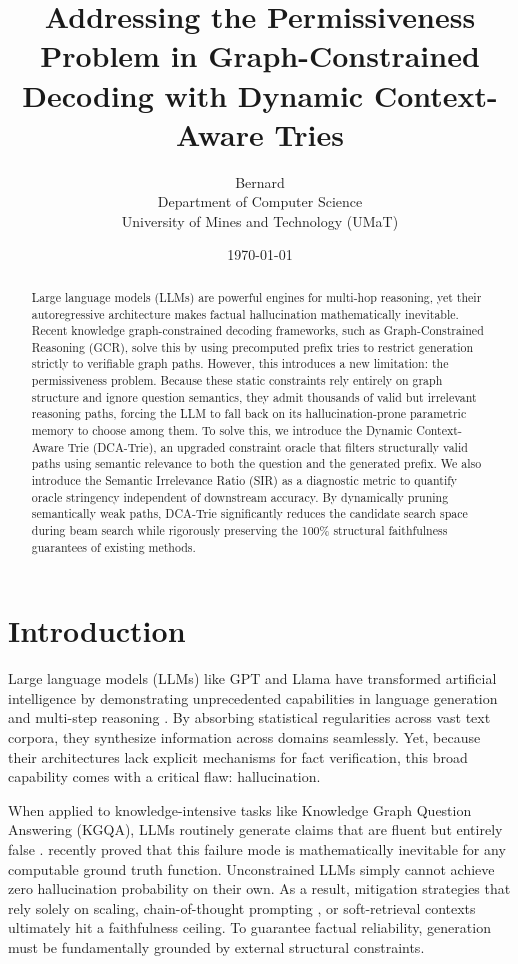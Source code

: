 \documentclass[11pt, letterpaper]{article}
\title{Addressing the Permissiveness Problem in Graph-Constrained Decoding with Dynamic Context-Aware Tries}
\author{Bernard \\
Department of Computer Science \\
University of Mines and Technology (UMaT)}
\date{\today}
\begin{document}
\maketitle

\begin{abstract}
    Large language models (LLMs) are powerful engines for multi-hop reasoning, yet their autoregressive architecture makes factual hallucination mathematically inevitable. Recent knowledge graph-constrained decoding frameworks, such as Graph-Constrained Reasoning (GCR), solve this by using precomputed prefix tries to restrict generation strictly to verifiable graph paths. However, this introduces a new limitation: the permissiveness problem. Because these static constraints rely entirely on graph structure and ignore question semantics, they admit thousands of valid but irrelevant reasoning paths, forcing the LLM to fall back on its hallucination-prone parametric memory to choose among them. To solve this, we introduce the Dynamic Context-Aware Trie (DCA-Trie), an upgraded constraint oracle that filters structurally valid paths using semantic relevance to both the question and the generated prefix. We also introduce the Semantic Irrelevance Ratio (SIR) as a diagnostic metric to quantify oracle stringency independent of downstream accuracy. By dynamically pruning semantically weak paths, DCA-Trie significantly reduces the candidate search space during beam search while rigorously preserving the 100\% structural faithfulness guarantees of existing methods.
\end{abstract}

\section{Introduction}

Large language models (LLMs) like GPT and Llama have transformed artificial intelligence by demonstrating unprecedented capabilities in language generation and multi-step reasoning \citep{brown2020gpt3, touvron2023llama}. By absorbing statistical regularities across vast text corpora, they synthesize information across domains seamlessly. Yet, because their architectures lack explicit mechanisms for fact verification, this broad capability comes with a critical flaw: hallucination.

When applied to knowledge-intensive tasks like Knowledge Graph Question Answering (KGQA), LLMs routinely generate claims that are fluent but entirely false \citep{ji2023survey}. \citet{xu2025hallucinationinevitableinnatelimitation} recently proved that this failure mode is mathematically inevitable for any computable ground truth function. Unconstrained LLMs simply cannot achieve zero hallucination probability on their own. As a result, mitigation strategies that rely solely on scaling, chain-of-thought prompting \citep{wei2022cot}, or soft-retrieval contexts \citep{lewis2020rag} ultimately hit a faithfulness ceiling. To guarantee factual reliability, generation must be fundamentally grounded by external structural constraints.
\end{document}

